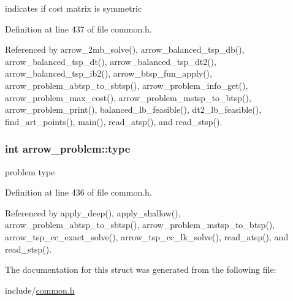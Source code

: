 indicates if cost matrix is symmetric 

Definition at line 437 of file common.h.

Referenced by arrow\_\-2mb\_\-solve(), arrow\_\-balanced\_\-tsp\_\-db(), arrow\_\-balanced\_\-tsp\_\-dt(), arrow\_\-balanced\_\-tsp\_\-dt2(), arrow\_\-balanced\_\-tsp\_\-ib2(), arrow\_\-btsp\_\-fun\_\-apply(), arrow\_\-problem\_\-abtsp\_\-to\_\-sbtsp(), arrow\_\-problem\_\-info\_\-get(), arrow\_\-problem\_\-max\_\-cost(), arrow\_\-problem\_\-mstsp\_\-to\_\-btsp(), arrow\_\-problem\_\-print(), balanced\_\-lb\_\-feasible(), dt2\_\-lb\_\-feasible(), find\_\-art\_\-points(), main(), read\_\-atsp(), and read\_\-stsp().\hypertarget{structarrow__problem_42c44f8d75c6e7a1c7440ac472b8594b}{
\subsubsection[{type}]{\setlength{\rightskip}{0pt plus 5cm}int {\bf arrow\_\-problem::type}}}
\label{structarrow__problem_42c44f8d75c6e7a1c7440ac472b8594b}


problem type 

Definition at line 436 of file common.h.

Referenced by apply\_\-deep(), apply\_\-shallow(), arrow\_\-problem\_\-abtsp\_\-to\_\-sbtsp(), arrow\_\-problem\_\-mstsp\_\-to\_\-btsp(), arrow\_\-tsp\_\-cc\_\-exact\_\-solve(), arrow\_\-tsp\_\-cc\_\-lk\_\-solve(), read\_\-atsp(), and read\_\-stsp().

The documentation for this struct was generated from the following file:\begin{CompactItemize}
\item 
include/\hyperlink{common_8h}{common.h}\end{CompactItemize}
